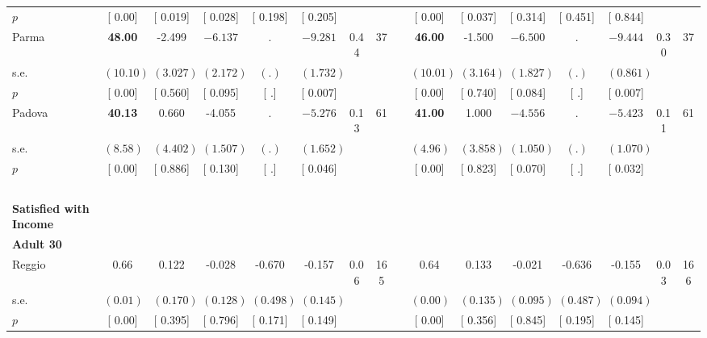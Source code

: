\begin{longtable}{L{8em} c c c c c c c p{1em} c c c c c c c}
\quad \quad \quad \quad $ p$ & [     0.00] & [    0.019] & [    0.028] & [    0.198] & [    0.205] & & & & [     0.00] & [    0.037] & [    0.314] & [    0.451] & [    0.844] & &  \\[1em]
\quad \quad \quad Parma& \textbf{    48.00} &    -2.499 & $ \mathbf{   -6.137}$ &         . & $ \mathbf{   -9.281}$ &      0.44 &        37 & & \textbf{    46.00} &    -1.500 & $ \mathbf{   -6.500}$ &         . & $ \mathbf{   -9.444}$ &      0.30 &        37  \\*
\quad \quad \quad \quad s.e.& $ (    10.10)$ & $ (    3.027)$ & $ (    2.172)$ & $ (        .)$ & $ (    1.732)$ & & & & $ (    10.01)$ & $ (    3.164)$ & $ (    1.827)$ & $ (        .)$ & $ (    0.861)$ & &  \\*
\quad \quad \quad \quad $ p$ & [     0.00] & [    0.560] & [    0.095] & [        .] & [    0.007] & & & & [     0.00] & [    0.740] & [    0.084] & [        .] & [    0.007] & &  \\[1em]
\quad \quad \quad Padova& \textbf{    40.13} &     0.660 &    -4.055 &         . & $ \mathbf{   -5.276}$ &      0.13 &        61 & & \textbf{    41.00} &     1.000 & $ \mathbf{   -4.556}$ &         . & $ \mathbf{   -5.423}$ &      0.11 &        61  \\*
\quad \quad \quad \quad s.e.& $ (     8.58)$ & $ (    4.402)$ & $ (    1.507)$ & $ (        .)$ & $ (    1.652)$ & & & & $ (     4.96)$ & $ (    3.858)$ & $ (    1.050)$ & $ (        .)$ & $ (    1.070)$ & &  \\*
\quad \quad \quad \quad $ p$ & [     0.00] & [    0.886] & [    0.130] & [        .] & [    0.046] & & & & [     0.00] & [    0.823] & [    0.070] & [        .] & [    0.032] & &  \\[1em]
~\\[1em]
\textbf{Satisfied with Income} \\*
\quad \quad \textbf{Adult 30} & & & & & & & & & & & & & & & \\* 
\quad \quad \quad Reggio& 0.66 &     0.122 &    -0.028 &    -0.670 &    -0.157 &      0.06 &       165 & & 0.64 &     0.133 &    -0.021 &    -0.636 &    -0.155 &      0.03 &       166  \\*
\quad \quad \quad \quad s.e.& $ (     0.01)$ & $ (    0.170)$ & $ (    0.128)$ & $ (    0.498)$ & $ (    0.145)$ & & & & $ (     0.00)$ & $ (    0.135)$ & $ (    0.095)$ & $ (    0.487)$ & $ (    0.094)$ & &  \\*
\quad \quad \quad \quad $ p$ & [     0.00] & [    0.395] & [    0.796] & [    0.171] & [    0.149] & & & & [     0.00] & [    0.356] & [    0.845] & [    0.195] & [    0.145] & &  \\[1em]

\end{longtable}
